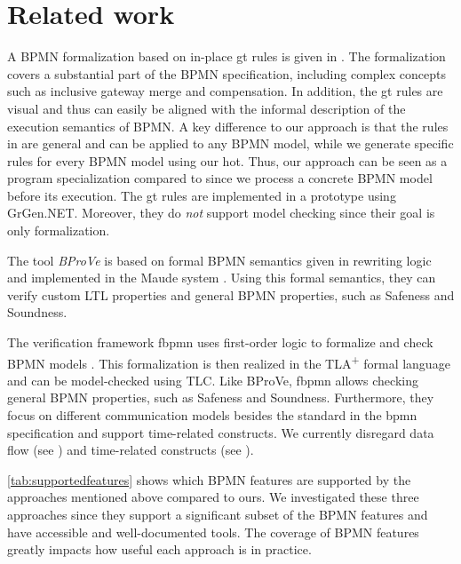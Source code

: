 \documentclass[runningheads]{llncs}
\begin{document}
\section{Related work} \label{sec:relatedWork}
A BPMN formalization based on in-place \gls*{gt} rules is given in \cite{vangorpVisualTokenbasedFormalization2013}.
The formalization covers a substantial part of the BPMN specification, including complex concepts such as inclusive gateway merge and compensation.
In addition, the \gls*{gt} rules are visual and thus can easily be aligned with the informal description of the execution semantics of BPMN.
A key difference to our approach is that the rules in \cite{vangorpVisualTokenbasedFormalization2013} are general and can be applied to any BPMN model, while we generate specific rules for every BPMN model using our \gls*{hot}.
Thus, our approach can be seen as a program specialization compared to \cite{vangorpVisualTokenbasedFormalization2013} since we process a concrete BPMN model before its execution.
The \gls*{gt} rules are implemented in a prototype using GrGen.NET.
Moreover, they do \textit{not} support model checking since their goal is only formalization.

The tool \textit{BProVe} is based on formal BPMN semantics given in rewriting logic and implemented in the Maude system \cite{corradiniFormalApproachAnalysis2021}.
Using this formal semantics, they can verify custom LTL properties and general BPMN properties, such as Safeness and Soundness.

The verification framework \textsf{fbpmn} uses first-order logic to formalize and check BPMN models \cite{houhouFirstOrderLogicVerification2022}.
This formalization is then realized in the TLA\textsuperscript{+} formal language and can be model-checked using TLC.
Like BProVe, \textsf{fbpmn} allows checking general BPMN properties, such as Safeness and Soundness.
Furthermore, they focus on different communication models besides the standard in the \gls*{bpmn} specification and support time-related constructs.
We currently disregard data flow (see \cite{corradiniFormalisingAnimatingMultiple2022,el-saberCMMICMComplianceChecking2015}) and time-related constructs (see \cite{duranVerifyingTimedBPMN2017,houhouFirstOrderLogicVerification2022}).

\autoref{tab:supportedfeatures} shows which BPMN features are supported by the approaches mentioned above compared to ours.
We investigated these three approaches since they support a significant subset of the BPMN features and have accessible and well-documented tools.
The coverage of BPMN features greatly impacts how useful each approach is in practice.
\end{document}
